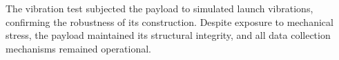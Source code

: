 The vibration test subjected the payload to simulated launch vibrations, confirming the robustness of its construction. Despite exposure to mechanical stress, the payload maintained its structural integrity, and all data collection mechanisms remained operational.




